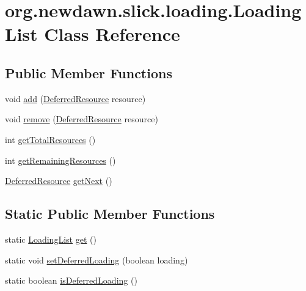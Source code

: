 \hypertarget{classorg_1_1newdawn_1_1slick_1_1loading_1_1_loading_list}{}\section{org.\+newdawn.\+slick.\+loading.\+Loading\+List Class Reference}
\label{classorg_1_1newdawn_1_1slick_1_1loading_1_1_loading_list}
\subsection*{Public Member Functions}
\begin{DoxyCompactItemize}
\item 
void \mbox{\hyperlink{classorg_1_1newdawn_1_1slick_1_1loading_1_1_loading_list_af03554660af12999832ad6c0cb3fdc46}{add}} (\mbox{\hyperlink{interfaceorg_1_1newdawn_1_1slick_1_1loading_1_1_deferred_resource}{Deferred\+Resource}} resource)
\item 
void \mbox{\hyperlink{classorg_1_1newdawn_1_1slick_1_1loading_1_1_loading_list_a92d80f591b97a13c9e9b9a6c0c1b359b}{remove}} (\mbox{\hyperlink{interfaceorg_1_1newdawn_1_1slick_1_1loading_1_1_deferred_resource}{Deferred\+Resource}} resource)
\item 
int \mbox{\hyperlink{classorg_1_1newdawn_1_1slick_1_1loading_1_1_loading_list_ae3458b4d334c4e5e8066bee1412e5991}{get\+Total\+Resources}} ()
\item 
int \mbox{\hyperlink{classorg_1_1newdawn_1_1slick_1_1loading_1_1_loading_list_a15644b340a431d1a2b6cdd52bd1ecf6d}{get\+Remaining\+Resources}} ()
\item 
\mbox{\hyperlink{interfaceorg_1_1newdawn_1_1slick_1_1loading_1_1_deferred_resource}{Deferred\+Resource}} \mbox{\hyperlink{classorg_1_1newdawn_1_1slick_1_1loading_1_1_loading_list_a2bb33107be5c921db8e65ef94a6d51e0}{get\+Next}} ()
\end{DoxyCompactItemize}
\subsection*{Static Public Member Functions}
\begin{DoxyCompactItemize}
\item 
static \mbox{\hyperlink{classorg_1_1newdawn_1_1slick_1_1loading_1_1_loading_list}{Loading\+List}} \mbox{\hyperlink{classorg_1_1newdawn_1_1slick_1_1loading_1_1_loading_list_a5c39c46ae4f8c0888997e91d46243484}{get}} ()
\item 
static void \mbox{\hyperlink{classorg_1_1newdawn_1_1slick_1_1loading_1_1_loading_list_a9a281f8df719d3727533fb55ae9b4234}{set\+Deferred\+Loading}} (boolean loading)
\item 
static boolean \mbox{\hyperlink{classorg_1_1newdawn_1_1slick_1_1loading_1_1_loading_list_afad049e7891ae5e6d7fc194664ca58b4}{is\+Deferred\+Loading}} ()
\end{DoxyCompactItemize}

